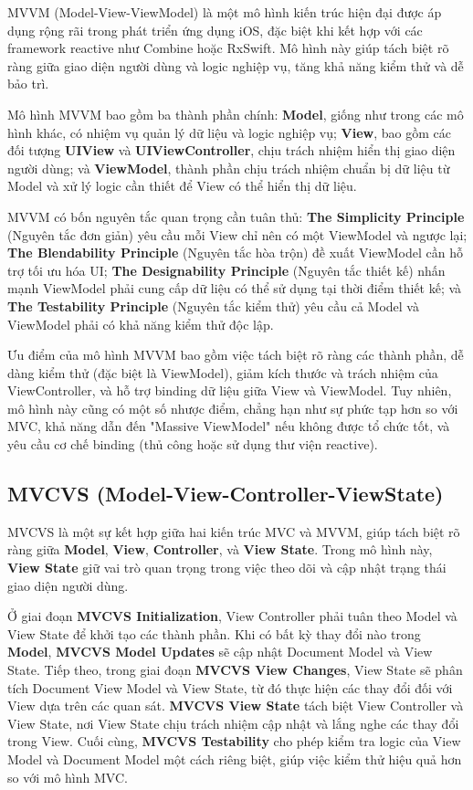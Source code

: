   MVVM (Model-View-ViewModel) là một mô hình kiến trúc hiện đại được áp dụng rộng rãi trong phát triển ứng dụng iOS, đặc biệt khi kết hợp với các framework reactive như Combine hoặc RxSwift. Mô hình này giúp tách biệt rõ ràng giữa giao diện người dùng và logic nghiệp vụ, tăng khả năng kiểm thử và dễ bảo trì.

  Mô hình MVVM bao gồm ba thành phần chính: \textbf{Model}, giống như trong các mô hình khác, có nhiệm vụ quản lý dữ liệu và logic nghiệp vụ; \textbf{View}, bao gồm các đối tượng \textbf{UIView} và \textbf{UIViewController}, chịu trách nhiệm hiển thị giao diện người dùng; và \textbf{ViewModel}, thành phần chịu trách nhiệm chuẩn bị dữ liệu từ Model và xử lý logic cần thiết để View có thể hiển thị dữ liệu.

  MVVM có bốn nguyên tắc quan trọng cần tuân thủ: \textbf{The Simplicity Principle} (Nguyên tắc đơn giản) yêu cầu mỗi View chỉ nên có một ViewModel và ngược lại; \textbf{The Blendability Principle} (Nguyên tắc hòa trộn) đề xuất ViewModel cần hỗ trợ tối ưu hóa UI; \textbf{The Designability Principle} (Nguyên tắc thiết kế) nhấn mạnh ViewModel phải cung cấp dữ liệu có thể sử dụng tại thời điểm thiết kế; và \textbf{The Testability Principle} (Nguyên tắc kiểm thử) yêu cầu cả Model và ViewModel phải có khả năng kiểm thử độc lập.

  Ưu điểm của mô hình MVVM bao gồm việc tách biệt rõ ràng các thành phần, dễ dàng kiểm thử (đặc biệt là ViewModel), giảm kích thước và trách nhiệm của ViewController, và hỗ trợ binding dữ liệu giữa View và ViewModel. Tuy nhiên, mô hình này cũng có một số nhược điểm, chẳng hạn như sự phức tạp hơn so với MVC, khả năng dẫn đến "Massive ViewModel" nếu không được tổ chức tốt, và yêu cầu cơ chế binding (thủ công hoặc sử dụng thư viện reactive).

  \subsection{MVCVS (Model-View-Controller-ViewState)}

  MVCVS là một sự kết hợp giữa hai kiến trúc MVC và MVVM, giúp tách biệt rõ ràng giữa \textbf{Model}, \textbf{View}, \textbf{Controller}, và \textbf{View State}. Trong mô hình này, \textbf{View State} giữ vai trò quan trọng trong việc theo dõi và cập nhật trạng thái giao diện người dùng.

  Ở giai đoạn \textbf{MVCVS Initialization}, View Controller phải tuân theo Model và View State để khởi tạo các thành phần. Khi có bất kỳ thay đổi nào trong \textbf{Model}, \textbf{MVCVS Model Updates} sẽ cập nhật Document Model và View State. Tiếp theo, trong giai đoạn \textbf{MVCVS View Changes}, View State sẽ phân tích Document View Model và View State, từ đó thực hiện các thay đổi đối với View dựa trên các quan sát. \textbf{MVCVS View State} tách biệt View Controller và View State, nơi View State chịu trách nhiệm cập nhật và lắng nghe các thay đổi trong View. Cuối cùng, \textbf{MVCVS Testability} cho phép kiểm tra logic của View Model và Document Model một cách riêng biệt, giúp việc kiểm thử hiệu quả hơn so với mô hình MVC.

